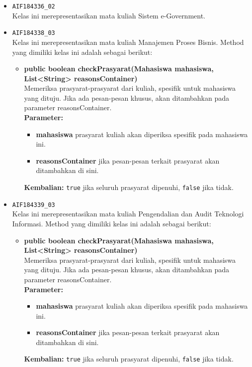 \begin{enumerate}
\begin{itemize}
\begin{itemize}
		\end{itemize}
		\item \texttt{AIF184336\_02} \\
		Kelas ini merepresentasikan mata kuliah Sistem e-Government.
		\item \texttt{AIF184338\_03} \\
		Kelas ini merepresentasikan mata kuliah Manajemen Proses Bisnis. Method yang dimiliki kelas ini adalah sebagai berikut: 
		\begin{itemize}
			\item \textbf{public boolean checkPrasyarat(Mahasiswa mahasiswa, List<String> reasonsContainer)}\\
			Memeriksa prasyarat-prasyarat dari kuliah, spesifik untuk mahasiswa yang dituju. Jika ada pesan-pesan khusus, akan ditambahkan pada parameter reasonsContainer.\\
			\textbf{Parameter:}
			\begin{itemize}
				\item \textbf{mahasiswa} prasyarat kuliah akan diperiksa spesifik pada mahasiswa ini.
				\item \textbf{reasonsContainer} jika pesan-pesan terkait prasyarat akan ditambahkan di sini.
			\end{itemize}
			\textbf{Kembalian:} \texttt{true} jika seluruh prasyarat dipenuhi, \texttt{false} jika tidak.
		\end{itemize}
		\item \texttt{AIF184339\_03} \\
		Kelas ini merepresentasikan mata kuliah Pengendalian dan Audit Teknologi Informasi. Method yang dimiliki kelas ini adalah sebagai berikut: 
		\begin{itemize}
			\item \textbf{public boolean checkPrasyarat(Mahasiswa mahasiswa, List<String> reasonsContainer)}\\
			Memeriksa prasyarat-prasyarat dari kuliah, spesifik untuk mahasiswa yang dituju. Jika ada pesan-pesan khusus, akan ditambahkan pada parameter reasonsContainer.\\
			\textbf{Parameter:}
			\begin{itemize}
				\item \textbf{mahasiswa} prasyarat kuliah akan diperiksa spesifik pada mahasiswa ini.
				\item \textbf{reasonsContainer} jika pesan-pesan terkait prasyarat akan ditambahkan di sini.
			\end{itemize}
			\textbf{Kembalian:} \texttt{true} jika seluruh prasyarat dipenuhi, \texttt{false} jika tidak.

\end{itemize}
\end{itemize}
\end{enumerate}
